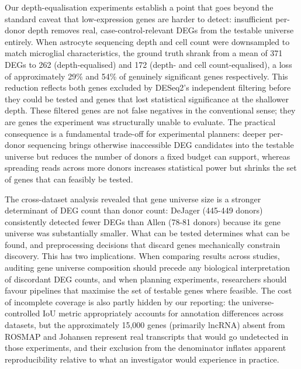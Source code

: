 \documentclass[
]{article}
\begin{document}
Our depth-equalisation experiments establish a point that goes beyond
the standard caveat that low-expression genes are harder to detect:
insufficient per-donor depth removes real, case-control-relevant DEGs
from the testable universe entirely. When astrocyte sequencing depth and
cell count were downsampled to match microglial characteristics, the
ground truth shrank from a mean of 371 DEGs to 262 (depth-equalised) and
172 (depth- and cell count-equalised), a loss of approximately 29\% and
54\% of genuinely significant genes respectively. This reduction
reflects both genes excluded by DESeq2's independent filtering before
they could be tested and genes that lost statistical significance at the
shallower depth. These filtered genes are not false negatives in the
conventional sense; they are genes the experiment was structurally
unable to evaluate. The practical consequence is a fundamental trade-off
for experimental planners: deeper per-donor sequencing brings otherwise
inaccessible DEG candidates into the testable universe but reduces the
number of donors a fixed budget can support, whereas spreading reads
across more donors increases statistical power but shrinks the set of
genes that can feasibly be tested.

The cross-dataset analysis revealed that gene universe size is a
stronger determinant of DEG count than donor count: DeJager (445-449
donors) consistently detected fewer DEGs than Allen (78-81 donors)
because its gene universe was substantially smaller. What can be tested
determines what can be found, and preprocessing decisions that discard
genes mechanically constrain discovery. This has two implications. When
comparing results across studies, auditing gene universe composition
should precede any biological interpretation of discordant DEG counts,
and when planning experiments, researchers should favour pipelines that
maximise the set of testable genes where feasible. The cost of
incomplete coverage is also partly hidden by our reporting: the
universe-controlled IoU metric appropriately accounts for annotation
differences across datasets, but the approximately 15,000 genes
(primarily lncRNA) absent from ROSMAP and Johansen represent real
transcripts that would go undetected in those experiments, and their
exclusion from the denominator inflates apparent reproducibility
relative to what an investigator would experience in practice.
\end{document}
